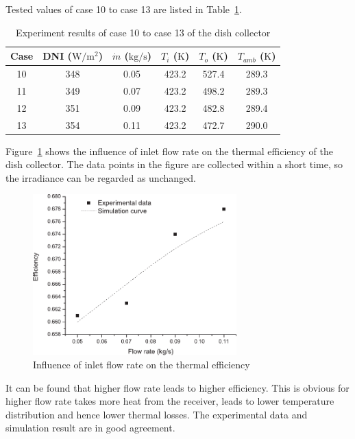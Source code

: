 Tested values of case 10 to case 13 are listed in Table~\ref{tab:ResultOfDish2}.

\begin{table}[htbp]\footnotesize
	\caption{Experiment results of case 10 to case 13 of the dish collector}
	\begin{center}
	\begin{tabular}{cccccc}
		\toprule
		Case	& DNI ($\mathrm{W/m^2}$)	&	$\dot{m}$ ($\mathrm{kg/s}$)			&	$T_i$ ($\mathrm{K}$)	&	$T_o$ ($\mathrm{K}$)		&	$T_{amb}$ ($\mathrm{K}$)\\
		\midrule
		10	&	348	&	0.05	&	423.2	&	527.4	&	289.3\\
		11	&	349	&	0.07	&	423.2	&	498.2	&	289.3\\
		12	&	351	&	0.09	&	423.2	&	482.8	&	289.4	\\
		13	&	354	&	0.11	&	423.2	&	472.7	&	290.0\\
		\bottomrule
	\end{tabular}
	\end{center}
	\label{tab:ResultOfDish2}
\end{table}


Figure~\ref{fig:q_m-eta} shows the influence of inlet flow rate on the thermal efficiency of the dish collector. The data points in the figure are collected within a short time, so the irradiance can be regarded as unchanged.
\begin{figure}[!ht]
\centering
\includegraphics[width=0.7\textwidth]{fig/q_m-eta}
\caption{Influence of inlet flow rate on the thermal efficiency}
\label{fig:q_m-eta}
\end{figure}

It can be found that higher flow rate leads to higher efficiency. This is obvious for higher flow rate takes more heat from the receiver, leads to lower temperature distribution and hence lower thermal losses. The experimental data and simulation result are in good agreement.

